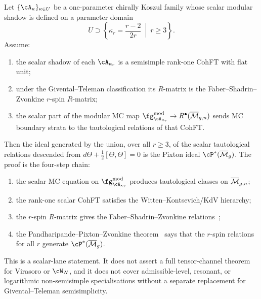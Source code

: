 \begin{theorem}
\label{thm:pixton-semisimple}
Let $\{\cA_{\kappa}\}_{\kappa\in U}$ be a one-parameter
chirally Koszul family whose scalar modular shadow is defined on a
parameter domain
\[
U\supset \left\{\kappa_r=\frac{r-2}{2r}\ \middle|\ r\ge 3\right\}.
\]
Assume:
\begin{enumerate}[label=\textup{(\alph*)}]
\item the scalar shadow of each $\cA_{\kappa_r}$ is a semisimple
rank-one CohFT with flat unit;
\item under the Givental--Teleman classification its $R$-matrix is
the Faber--Shadrin--Zvonkine $r$-spin $R$-matrix;
\item the scalar part of the modular MC map
$\fg^{\mathrm{mod}}_{\cA_{\kappa_r}}\to
\Rring(\overline{\cM}_{g,n})$ sends MC boundary strata to the
tautological relations of that CohFT.
\end{enumerate}
Then the ideal generated by the union, over all $r\ge3$, of the
scalar tautological relations descended from
$d\Theta + \tfrac{1}{2}[\Theta,\Theta]=0$ is the Pixton ideal
$\cP^*(\overline{\cM}_g)$.  The proof is the four-step chain:
\begin{enumerate}[label=\textup{(\roman*)}]
\item the scalar MC equation on
 $\fg^{\mathrm{mod}}_{\cA_{\kappa_r}}$ produces tautological
 classes on $\overline{\mathcal M}_{g,n}$;
\item the rank-one scalar CohFT satisfies the
 Witten--Kontsevich/KdV hierarchy;
\item the $r$-spin $R$-matrix gives the
 Faber--Shadrin--Zvonkine relations~\cite{FSZ10};
\item the Pandharipande--Pixton--Zvonkine theorem~\cite{PPZ15}
 says that the $r$-spin relations for all $r$ generate
 $\cP^*(\overline{\cM}_g)$.
\end{enumerate}
This is a scalar-lane statement.  It does not assert a full
tensor-channel theorem for Virasoro or $\cW_N$, and it does not
cover admissible-level, resonant, or logarithmic non-semisimple
specialisations without a separate replacement for
Givental--Teleman semisimplicity.
\end{theorem}

